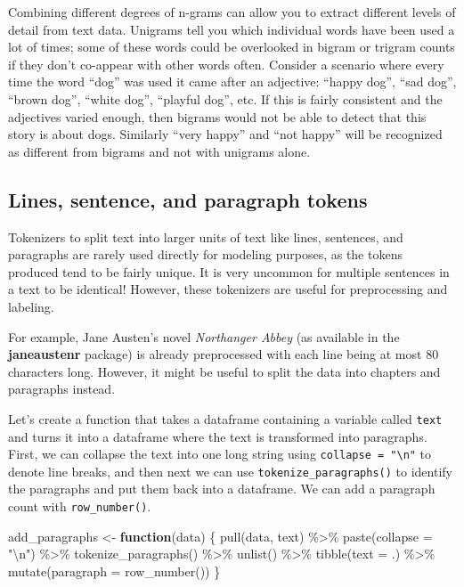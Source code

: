\documentclass[
]{krantz}
\makeatletter
\newenvironment{Shaded}{\begin{snugshade}}{\end{snugshade}}
\newcommand{\AttributeTok}[1]{\textcolor[rgb]{0.77,0.63,0.00}{#1}}
\newcommand{\ControlFlowTok}[1]{\textcolor[rgb]{0.13,0.29,0.53}{\textbf{#1}}}
\newcommand{\FunctionTok}[1]{\textcolor[rgb]{0.00,0.00,0.00}{#1}}
\newcommand{\NormalTok}[1]{#1}
\newcommand{\OtherTok}[1]{\textcolor[rgb]{0.56,0.35,0.01}{#1}}
\newcommand{\SpecialCharTok}[1]{\textcolor[rgb]{0.00,0.00,0.00}{#1}}
\newcommand{\StringTok}[1]{\textcolor[rgb]{0.31,0.60,0.02}{#1}}
\newenvironment{kframe}{%
\medskip{}
\setlength{\fboxsep}{.8em}
 \def\at@end@of@kframe{}%
 \ifinner\ifhmode%
  \def\at@end@of@kframe{\end{minipage}}%
  \begin{minipage}{\columnwidth}%
 \fi\fi%
 \def\FrameCommand##1{\hskip\@totalleftmargin \hskip-\fboxsep
 \colorbox{shadecolor}{##1}\hskip-\fboxsep
     \hskip-\linewidth \hskip-\@totalleftmargin \hskip\columnwidth}%
 \MakeFramed {\advance\hsize-\width
   \@totalleftmargin\z@ \linewidth\hsize
   \@setminipage}}%
 {\par\unskip\endMakeFramed%
 \at@end@of@kframe}
\renewenvironment{Shaded}{\begin{kframe}}{\end{kframe}}
\makeatother
\begin{document}
Combining different degrees of n-grams can allow you to extract different levels of detail from text data. Unigrams tell you which individual words have been used a lot of times; some of these words could be overlooked in bigram or trigram counts if they don't co-appear with other words often. Consider a scenario where every time the word ``dog'' was used it came after an adjective: ``happy dog'', ``sad dog'', ``brown dog'', ``white dog'', ``playful dog'', etc. If this is fairly consistent and the adjectives varied enough, then bigrams would not be able to detect that this story is about dogs. Similarly ``very happy'' and ``not happy'' will be recognized as different from bigrams and not with unigrams alone.

\hypertarget{lines-sentence-and-paragraph-tokens}{%
\subsection{Lines, sentence, and paragraph tokens}\label{lines-sentence-and-paragraph-tokens}}

Tokenizers to split text into larger units of text like lines, sentences, and paragraphs are rarely used directly for modeling purposes, as the tokens produced tend to be fairly unique. It is very uncommon for multiple sentences in a text to be identical! However, these tokenizers are useful for preprocessing and labeling.

For example, Jane Austen's novel \emph{Northanger Abbey} (as available in the \textbf{janeaustenr} package) is already preprocessed with each line being at most 80 characters long. However, it might be useful to split the data into chapters and paragraphs instead.

Let's create a function that takes a dataframe containing a variable called \texttt{text} and turns it into a dataframe where the text is transformed into paragraphs. First, we can collapse the text into one long string using \texttt{collapse\ =\ "\textbackslash{}n"} to denote line breaks, and then next we can use \texttt{tokenize\_paragraphs()} to identify the paragraphs and put them back into a dataframe. We can add a paragraph count with \texttt{row\_number()}.

\begin{Shaded}
\begin{Highlighting}[]
\NormalTok{add\_paragraphs }\OtherTok{\textless{}{-}} \ControlFlowTok{function}\NormalTok{(data) \{}
  \FunctionTok{pull}\NormalTok{(data, text) }\SpecialCharTok{\%\textgreater{}\%}
    \FunctionTok{paste}\NormalTok{(}\AttributeTok{collapse =} \StringTok{"}\SpecialCharTok{\textbackslash{}n}\StringTok{"}\NormalTok{) }\SpecialCharTok{\%\textgreater{}\%}
    \FunctionTok{tokenize\_paragraphs}\NormalTok{() }\SpecialCharTok{\%\textgreater{}\%}
    \FunctionTok{unlist}\NormalTok{() }\SpecialCharTok{\%\textgreater{}\%}
    \FunctionTok{tibble}\NormalTok{(}\AttributeTok{text =}\NormalTok{ .) }\SpecialCharTok{\%\textgreater{}\%}
    \FunctionTok{mutate}\NormalTok{(}\AttributeTok{paragraph =} \FunctionTok{row\_number}\NormalTok{())}
\NormalTok{\}}
\end{Highlighting}
\end{Shaded}
\end{document}

